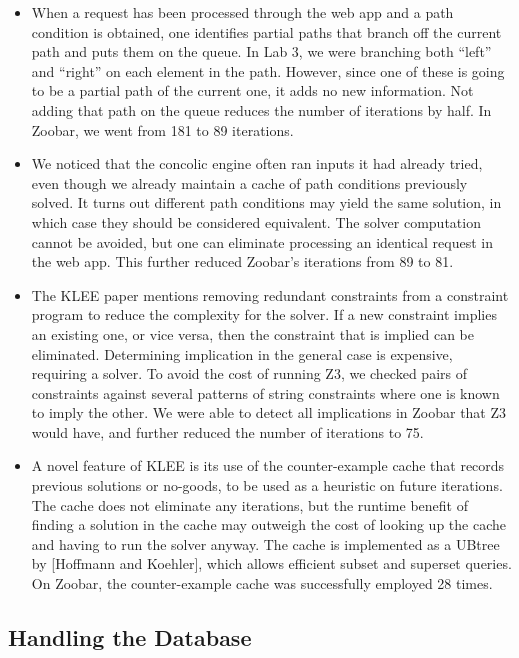 \documentclass{scrartcl}
\begin{document}
\begin{itemize}
\item When a request has been processed through the web app and a path
condition is obtained, one identifies partial paths that branch off the
current path and puts them on the queue. In Lab 3, we were branching
both ``left'' and ``right'' on each element in the path. However, since
one of these is going to be a partial path of the current one, it adds
no new information. Not adding that path on the queue reduces the number
of iterations by half. In Zoobar, we went from 181 to 89 iterations.

\item We noticed that the concolic engine often ran inputs it had
already tried, even though we already maintain a cache of path
conditions previously solved. It turns out different path conditions
may yield the same solution, in which case they should be considered
equivalent. The solver computation cannot be avoided, but one can
eliminate processing an identical request in the web app. This further
reduced Zoobar's iterations from 89 to 81.

\item The KLEE paper mentions removing redundant constraints from a
constraint program to reduce the complexity for the solver. If a new
constraint implies an existing one, or vice versa, then the constraint
that is implied can be eliminated.
Determining implication in the general case is expensive, requiring a
solver. To avoid the cost of running Z3, we checked pairs of constraints
against several patterns of string constraints where one is known to
imply the other. We were able to detect all implications in Zoobar that
Z3 would have, and further reduced the number of iterations to 75.

\item A novel feature of KLEE is its use of the counter-example cache
that records previous solutions or no-goods, to be used as a heuristic
on future iterations. The cache does not eliminate any iterations, but
the runtime benefit of finding a solution in the cache may outweigh the
cost of looking up the cache and having to run the solver anyway.
The cache is implemented as a UBtree by [Hoffmann and Koehler],
which allows efficient subset and superset queries. On Zoobar, the
counter-example cache was successfully employed 28 times.
\end{itemize}

\subsection{Handling the Database}
\end{document}
